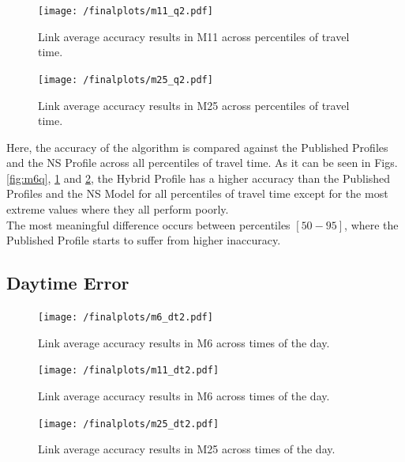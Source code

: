 \documentclass[conference, letterpaper]{IEEEtran}
\begin{document}
\begin{figure}[htbp]
	\centering
	\texttt{[image: /finalplots/m11\_q2.pdf]}
	\caption{Link average accuracy results in M11 across percentiles of travel time.}
	\label{fig:m11q}
\end{figure}

\begin{figure}[htbp]
	\centering
	\texttt{[image: /finalplots/m25\_q2.pdf]}
	\caption{Link average accuracy results in M25 across percentiles of travel time.}
	\label{fig:m25q}
\end{figure}
Here, the accuracy of the algorithm is compared against the Published Profiles and the NS Profile across all percentiles of travel time.
As it can be seen in Figs. \ref{fig:m6q}, \ref{fig:m11q} and \ref{fig:m25q}, the Hybrid Profile has a higher accuracy than the Published Profiles and the NS Model for all percentiles of travel time except for the most extreme values where they all perform poorly.\\
The most meaningful difference occurs between percentiles $[50-95]$, where the Published Profile starts to suffer from higher inaccuracy.

\subsection{Daytime Error}
\begin{figure}[htbp]
	\centering
		\texttt{[image: /finalplots/m6\_dt2.pdf]}
	\caption{Link average accuracy results in M6 across times of the day.}
	\label{fig:m6daytime}
\end{figure}

\begin{figure}[htbp]
	\centering
	\texttt{[image: /finalplots/m11\_dt2.pdf]}
	\caption{Link average accuracy results in M6 across times of the day.}
	\label{fig:m11daytime}
\end{figure}

\begin{figure}[htbp]
	\centering
	\texttt{[image: /finalplots/m25\_dt2.pdf]}
	\caption{Link average accuracy results in M25 across times of the day.}
	\label{fig:m25daytime}
\end{figure}
\end{document}
